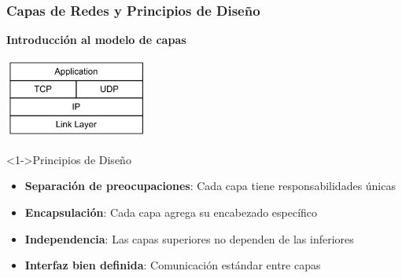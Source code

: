 \documentclass[aspectratio=169]{beamer}
\begin{document}
\begin{frame}
\frametitle{Capas de Redes y Principios de Diseño}

\begin{center}
\Large \textbf{Introducción al modelo de capas}
\end{center}

\begin{center}
\includegraphics[width=0.35\textwidth]{figuras/tcpsobreip.png}
\end{center}

\begin{block}<1->{Principios de Diseño}
\begin{itemize}
\item<1-> \textbf{Separación de preocupaciones}: Cada capa tiene responsabilidades únicas
\item<2-> \textbf{Encapsulación}: Cada capa agrega su encabezado específico
\item<3-> \textbf{Independencia}: Las capas superiores no dependen de las inferiores
\item<4-> \textbf{Interfaz bien definida}: Comunicación estándar entre capas
\end{itemize}
\end{block}

\end{frame}
\end{document}
